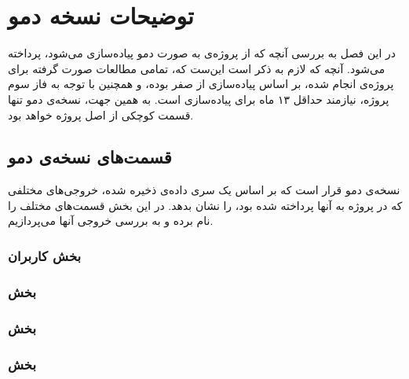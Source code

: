\documentclass[11pt, oneside]{book}
\begin{document}
\frontmatter

\tableofcontents
\mainmatter

\chapter{توضیحات نسخه دمو}
در این فصل به بررسی آنچه که از پروژه‌ی 
به صورت دمو پیاده‌سازی می‌شود، پرداخته می‌شود. آنچه که لازم به ذکر است این‌ست که، تمامی مطالعات صورت گرفته برای پروژه‌ی
انجام شده، بر اساس پیاده‌سازی از صفر بوده، و همچنین با توجه به فاز سوم پروژه، نیازمند حداقل ۱۳ ماه برای پیاده‌سازی است. به همین جهت، نسخه‌ی دمو تنها قسمت کوچکی از اصل پروژه خواهد بود.

\section{قسمت‌های نسخه‌ی دمو}
نسخه‌ی دمو قرار است که بر اساس یک سری داده‌ی ذخیره شده، خروجی‌های مختلفی که در پروژه به آنها پرداخته شده بود، را نشان بدهد. در این بخش قسمت‌های مختلف را نام برده و به بررسی خروجی آنها می‌پردازیم.

\subsection{بخش کاربران}
\subsection{بخش }
\subsection{بخش }
\subsection{بخش }
\end{document}
